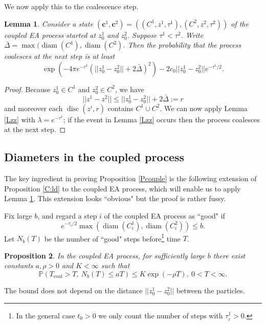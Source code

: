 \documentclass[12pt]{article}
\newtheorem{Lemma}{Lemma}
\newtheorem{Proposition}[Lemma]{Proposition}
\newcommand{\bc}{{\mathbf c}}
\renewcommand{\Pr}{{\mathbb P}}
\newcommand{\Tcouple}{T_{\mathrm{coal}}}
\DeclareMathOperator{\diam}{diam}
\DeclareMathOperator{\disc}{disc}
\begin{document}
We now apply this to the coalescence step.
\begin{Lemma}
\label{L:coal}
Consider a state $(\bc^1,\bc^2) = 
((C^1,z^1,\tau^1), (C^2,z^2,\tau^2))$
of the coupled EA process started at $z^1_0$ and 
$z^2_0$.
Suppose $\tau^1 < \tau^2$.  
Write 
$ \bar{\Delta} = \max(\diam(C^1), \diam(C^2)$.
Then the probability that the process coalesces at the next step
is at least
\begin{equation}
\exp(- 4\pi e^{-\tau^1}  (||z^1_0 - z^2_0||+2\bar{\Delta})^2)
- 2 c_0 || z^1_0 - z^2_0 || e^{-\tau^1/2}  .
\label{pitz}
\end{equation}
\end{Lemma}
\begin{proof}
Because $z^1_0 \in C^1$ and $z^2_0 \in C^2$,  we have
\[ ||z^1 - z^2|| \le || z^1_0 - z^2_0 || + 2\bar{\Delta} := r \]
and moreover each 
$\disc(z^i,r)$ contains $C^1 \cup C^2$. 
We can now apply Lemma \ref{Lzz} with 
$\lambda = e^{-\tau^1}$; if the event in  Lemma \ref{Lzz} occurs
then the process coalesces at the next step.
\end{proof}



\subsection{Diameters in the coupled process}
\label{sec:diamcoup}
The key ingredient  in proving Proposition \ref{Pcouple} is the following extension of Proposition \ref{C:ld} to the coupled EA process, 
which will enable us to apply Lemma \ref{L:coal}.
This extension looks ``obvious" but the proof is rather fussy. 

Fix large $b$, and regard a step $i$ of the coupled EA process as ``good" if 
\begin{equation}
e^{- \tau_i/2} 
\max( \diam(C^1_i), \diam (C^2_i) ) 
\le b .
\label{tCC}
\end{equation} 
Let $N_b(T)$ be the number of ``good" steps before\footnote{In the general case $t_0>0$ we only count the number of steps with $\tau^1_i > 0$.}
time $T$.
\begin{Proposition}
\label{P:diamcoup}
In the coupled EA process, for sufficiently large $b$ there exist constants $a, \rho > 0$ and $K< \infty$ such that
\[ \Pr(\Tcouple > T, \ N_b(T) \le aT) \le K \exp(-\rho T), \ 0 < T < \infty . \]
\end{Proposition}
The bound does not depend on the distance $|| z^1_0 - z^2_0||$ between the particles.
\end{document}
